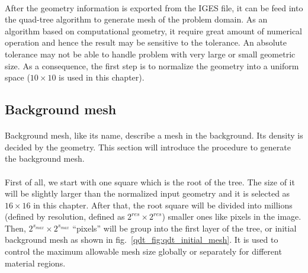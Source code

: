 \paragraph{}
After the geometry information is exported from the IGES file, it can be feed into the quad-tree algorithm to generate mesh of the problem domain.
As an algorithm based on computational geometry, it require great amount of numerical operation and hence the result may be sensitive to the tolerance.
An absolute tolerance may not be able to handle problem with very large or small geometric size.
As a consequence, the first step is to normalize the geometry into a uniform space ($10\times10$ is used in this chapter).

\subsection{Background mesh}
\paragraph{}
Background mesh, like its name, describe a mesh in the background. %
Its density is decided by the geometry.
This section will introduce the procedure to generate the background mesh.
\paragraph{}
First of all, we start with one square which is the root of the tree.
The size of it will be slightly larger than the normalized input geometry and it is selected as $16 \times 16$ in this chapter.
After that, the root square will be divided into millions (defined by resolution, defined as $2^{res} \times 2^{res}$) smaller ones like pixels in the image.
Then, $2^{s_{max}} \times 2^{s_{max}}$ ``pixels'' will be group into the first layer of the tree, or initial background mesh as shown in fig.~\ref{qdt_fig:qdt_initial_mesh}.
It is used to control the maximum allowable mesh size globally or separately for different material regions.

